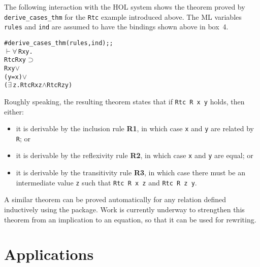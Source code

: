 The following interaction with the {\small HOL} system shows the theorem proved
by \verb!derive_cases_thm! for the \verb!Rtc! example introduced above.  The
{\small ML} variables \verb!rules! and \verb!ind! are assumed to have the
bindings shown above in box~4.

\smallskip

\begin{session}\begin{alltt}
#derive_cases_thm (rules,ind);;
\(\vdash\) \(\forall\,\)R x y.
    Rtc R x y \(\supset\)
      R x y   \(\vee\) 
      (y = x) \(\vee\) 
      (\(\exists\,\)z. Rtc R x z \(\wedge\) Rtc R z y)
\end{alltt}\end{session}

\smallskip

\noindent Roughly speaking, the resulting theorem states that if 
\verb!Rtc R x y! holds, then either:

\begin{itemize}

\item it is derivable by the inclusion rule {{\small\bf R}\bf 1}, in which
case \verb!x! and \verb!y! are related by \verb!R!; or

\item it is derivable by the reflexivity rule {{\small\bf R}\bf 2}, in which
case \verb!x! and \verb!y! are equal; or

\item it is derivable by the transitivity rule {{\small\bf R}\bf 3}, in which
case there must be an intermediate value \verb!z! such that \verb!Rtc R x z!
and \verb!Rtc R z y!.

\end{itemize}

\noindent A similar theorem can be proved automatically for any relation
defined inductively using the package. Work is currently underway to strengthen
this theorem from an implication to an equation, so that it can be used for
rewriting.

\section{Applications}\label{appl}

